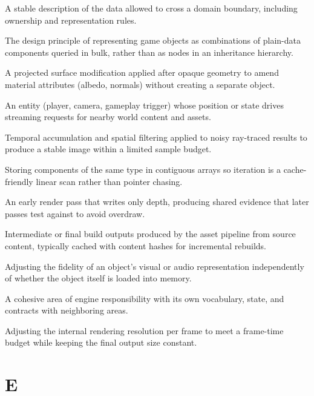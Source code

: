 \documentclass[
  11pt,
  letterpaper,
  DIV=11,
  numbers=noendperiod,
  twoside,
  open=right]{scrreprt}
\providecommand{\tightlist}{%
  \setlength{\itemsep}{0pt}\setlength{\parskip}{0pt}}
\begin{document}

\begin{description}
\tightlist
\item[\textbf{Data contract}]
A stable description of the data allowed to cross a domain boundary,
including ownership and representation rules.
\item[\textbf{Data-oriented composition}]
The design principle of representing game objects as combinations of
plain-data components queried in bulk, rather than as nodes in an
inheritance hierarchy.
\item[\textbf{Decal}]
A projected surface modification applied after opaque geometry to amend
material attributes (albedo, normals) without creating a separate
object.
\item[\textbf{Demand source}]
An entity (player, camera, gameplay trigger) whose position or state
drives streaming requests for nearby world content and assets.
\item[\textbf{Denoising}]
Temporal accumulation and spatial filtering applied to noisy ray-traced
results to produce a stable image within a limited sample budget.
\item[\textbf{Dense storage}]
Storing components of the same type in contiguous arrays so iteration is
a cache-friendly linear scan rather than pointer chasing.
\item[\textbf{Depth pre-pass}]
An early render pass that writes only depth, producing shared evidence
that later passes test against to avoid overdraw.
\item[\textbf{Derived data}]
Intermediate or final build outputs produced by the asset pipeline from
source content, typically cached with content hashes for incremental
rebuilds.
\item[\textbf{Detail streaming}]
Adjusting the fidelity of an object's visual or audio representation
independently of whether the object itself is loaded into memory.
\item[\textbf{Domain}]
A cohesive area of engine responsibility with its own vocabulary, state,
and contracts with neighboring areas.
\item[\textbf{Dynamic resolution}]
Adjusting the internal rendering resolution per frame to meet a
frame-time budget while keeping the final output size constant.
\end{description}

\section*{E}\label{e}
\end{document}

